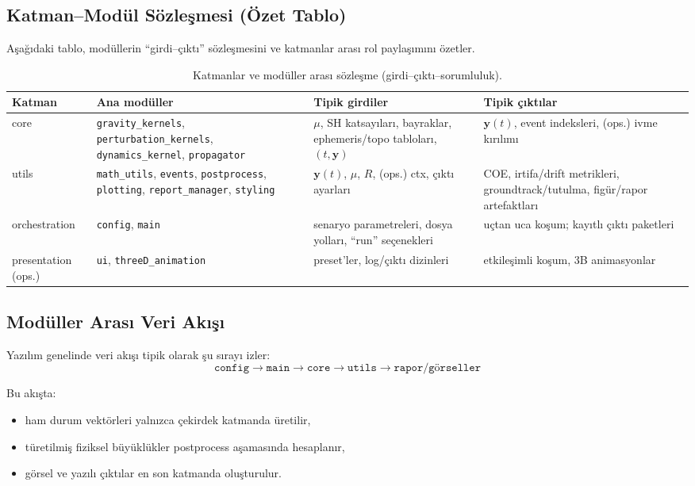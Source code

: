 \subsection{Katman--Modül Sözleşmesi (Özet Tablo)}

Aşağıdaki tablo, modüllerin “girdi--çıktı” sözleşmesini ve katmanlar arası rol paylaşımını özetler.

\begin{table}[H]
\centering
\caption{Katmanlar ve modüller arası sözleşme (girdi--çıktı--sorumluluk).}
\label{tab:layer_contract}
\small
\begin{tabular}{p{2.7cm} p{4.8cm} p{5.0cm} p{3.6cm}}
\hline
\textbf{Katman} & \textbf{Ana modüller} & \textbf{Tipik girdiler} & \textbf{Tipik çıktılar} \\
\hline
core &
\texttt{gravity\_kernels}, \texttt{perturbation\_kernels}, \texttt{dynamics\_kernel}, \texttt{propagator} &
\(\mu\), SH katsayıları, bayraklar, ephemeris/topo tabloları, \((t,\mathbf y)\) &
\(\mathbf y(t)\), event indeksleri, (ops.) ivme kırılımı \\
\hline
utils &
\texttt{math\_utils}, \texttt{events}, \texttt{postprocess}, \texttt{plotting}, \texttt{report\_manager}, \texttt{styling} &
\(\mathbf y(t)\), \(\mu\), \(R\), (ops.) ctx, çıktı ayarları &
COE, irtifa/drift metrikleri, groundtrack/tutulma, figür/rapor artefaktları \\
\hline
orchestration &
\texttt{config}, \texttt{main} &
senaryo parametreleri, dosya yolları, “run” seçenekleri &
uçtan uca koşum; kayıtlı çıktı paketleri \\
\hline
presentation (ops.) &
\texttt{ui}, \texttt{threeD\_animation} &
preset’ler, log/çıktı dizinleri &
etkileşimli koşum, 3B animasyonlar \\
\hline
\end{tabular}
\end{table}

\subsection{Modüller Arası Veri Akışı}

Yazılım genelinde veri akışı tipik olarak şu sırayı izler:
\[
\texttt{config} \rightarrow
\texttt{main} \rightarrow
\texttt{core} \rightarrow
\texttt{utils} \rightarrow
\texttt{rapor/görseller}
\]

Bu akışta:
\begin{itemize}
  \item ham durum vektörleri yalnızca çekirdek katmanda üretilir,
  \item türetilmiş fiziksel büyüklükler postprocess aşamasında hesaplanır,
  \item görsel ve yazılı çıktılar en son katmanda oluşturulur.
\end{itemize}

